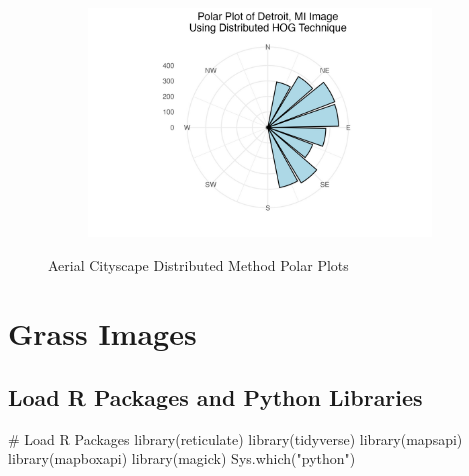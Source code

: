 \documentclass[
  letterpaper,
  DIV=11,
  numbers=noendperiod]{scrreprt}
\newenvironment{Shaded}{\begin{snugshade}}{\end{snugshade}}
\newcommand{\CommentTok}[1]{\textcolor[rgb]{0.37,0.37,0.37}{#1}}
\newcommand{\FunctionTok}[1]{\textcolor[rgb]{0.28,0.35,0.67}{#1}}
\newcommand{\NormalTok}[1]{\textcolor[rgb]{0.00,0.23,0.31}{#1}}
\newcommand{\StringTok}[1]{\textcolor[rgb]{0.13,0.47,0.30}{#1}}
\begin{document}
\begin{figure}
\begin{minipage}{0.33\linewidth}
\begin{figure}[H]
{}


\end{figure}%

\end{minipage}%
%
\begin{minipage}{0.33\linewidth}

\begin{figure}[H]

{\centering \includegraphics{images/plots/aerial_cities/detroit_contribution_polar_plot.jpg}

}


\end{figure}%

\end{minipage}%

\caption{\label{fig-city-distributed-polar}Aerial Cityscape Distributed
Method Polar Plots}

\end{figure}%

\chapter{Grass Images}\label{grass-images}

\section{Load R Packages and Python
Libraries}\label{load-r-packages-and-python-libraries-1}

\begin{Shaded}
\begin{Highlighting}[]
\CommentTok{\# Load R Packages}
\FunctionTok{library}\NormalTok{(reticulate)}
\FunctionTok{library}\NormalTok{(tidyverse)}
\FunctionTok{library}\NormalTok{(mapsapi)}
\FunctionTok{library}\NormalTok{(mapboxapi)}
\FunctionTok{library}\NormalTok{(magick)}
\FunctionTok{Sys.which}\NormalTok{(}\StringTok{"python"}\NormalTok{)}
\end{Highlighting}
\end{Shaded}
\end{document}
